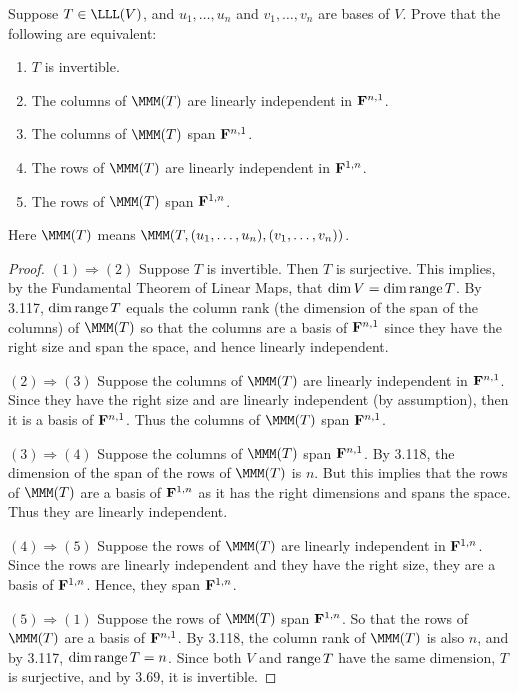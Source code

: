 \begin{exercise}{32}
  Suppose $T\in\LLL(V)$, and $u_1,\dots,u_n$ and $v_1,\dots,v_n$ are bases of $V$. Prove that the following are equivalent:
  \begin{enumerate}
      \item $T$ is invertible.
      \item The columns of $\MMM(T)$ are linearly independent in $\mathbf{F}^{n,1}$.
      \item The columns of $\MMM(T)$ span $\mathbf{F}^{n,1}$.
      \item The rows of $\MMM(T)$ are linearly independent in $\mathbf{F}^{1,n}$.
      \item The rows of $\MMM(T)$ span $\mathbf{F}^{1,n}$.
  \end{enumerate}
  Here $\MMM(T)$ means $\MMM(T,(u_1,\dots,u_n),(v_1,\dots,v_n))$.
\end{exercise}
\begin{proof}
 $(1)\Rightarrow (2)$ Suppose $T$ is invertible. Then $T$ is surjective. This implies, by the Fundamental Theorem of Linear Maps, that $\dim V = \dim\operatorname*{range} T$. By 3.117, $\dim\operatorname*{range} T$ equals the column rank (the dimension of the span of the columns) of $\MMM(T)$ so that the columns are a basis of $\mathbf{F}^{n,1}$ since they have the right size and span the space, and hence linearly independent.

$(2)\Rightarrow (3)$ Suppose the columns of $\MMM(T)$ are linearly independent in $\mathbf{F}^{n,1}$. Since they have the right size and are linearly independent (by assumption), then it is a basis of $\mathbf{F}^{n,1}$. Thus the columns of $\MMM(T)$ span $\mathbf{F}^{n,1}$.

$(3)\Rightarrow (4)$ Suppose the columns of $\MMM(T)$ span $\mathbf{F}^{n,1}$. By 3.118, the dimension of the span of the rows of $\MMM(T)$ is $n$. But this implies that the rows of $\MMM(T)$ are a basis of $\mathbf{F}^{1,n}$ as it has the right dimensions and spans the space. Thus they are linearly independent.

 $(4)\Rightarrow (5)$ Suppose the rows of $\MMM(T)$ are linearly independent in $\mathbf{F}^{1,n}$. Since the rows are linearly independent and they have the right size, they are a basis of $\mathbf{F}^{1,n}$. Hence, they span $\mathbf{F}^{1,n}$.

 $(5)\Rightarrow (1)$ Suppose the rows of $\MMM(T)$ span $\mathbf{F}^{1,n}$. So that the rows of $\MMM(T)$ are a basis of $\mathbf{F}^{n,1}$. By 3.118, the column rank of $\MMM(T)$ is also $n$, and by 3.117, $\dim\operatorname*{range} T=n$. Since both $V$ and $\operatorname*{range} T$ have the same dimension, $T$ is surjective, and by $3.69$, it is invertible.
\end{proof}

